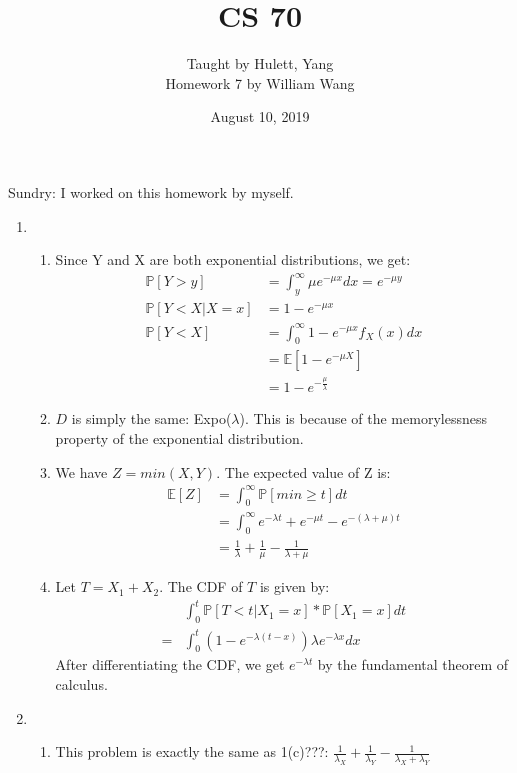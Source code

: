 \documentclass[a4paper]{article}
\title{\textbf{CS 70}}
\author{\large Taught by Hulett, Yang\\
Homework 7 by William Wang}
\date{August 10, 2019}
\newcommand{\E}{\mathbb{E}}
\renewcommand{\P}{\mathbb{P}}
\newcommand{\<}{\langle}
\renewcommand{\>}{\rangle}
\renewcommand{\^}{\wedge}
\begin{document}
\maketitle
\newpage
Sundry: I worked on this homework by myself.\\
\begin{enumerate}
   \item
        \begin{enumerate}
            \item Since Y and X are both exponential distributions, we get: 
            \begin{align*}
                \P[Y > y] &= \int_y^\infty \mu e^{-\mu x}dx = e^{-\mu y}\\
                \P[Y < X | X = x] &= 1 - e^{-\mu x} \\
                \P[Y < X] &= \int_0^\infty 1 - e^{-\mu x} f_X(x)dx\\
                &= \E[1 - e^{-\mu X}]\\
                &= 1 - e^{-\frac{\mu}{\lambda}}
            \end{align*}
            \item $D$ is simply the same: Expo($\lambda$). This is because of the memorylessness property of the exponential distribution.
            \item We have $Z = min(X, Y)$. The expected value of Z is:
            \begin{align*}
                \E[Z] &= \int_0^\infty \P[min \geq t] dt\\
                &= \int_0^\infty e^{-\lambda t} + e^{-\mu t} - e^{-(\lambda + \mu)t}\\
                &= \frac{1}{\lambda} + \frac{1}{\mu} - \frac{1}{\lambda + \mu}
            \end{align*}
            \item Let $T = X_1 + X_2$. The CDF of $T$ is given by:
            \begin{align*}
                &\int_0^t \P[T<t|X_1 = x] * \P[X_1 = x]dt\\
                = &\int_0^t (1-e^{-\lambda (t-x)})\lambda e^{-\lambda x}dx
            \end{align*}
            After differentiating the CDF, we get $e^{-\lambda t}$ by the fundamental theorem of calculus.
        \end{enumerate}
   \item
        \begin{enumerate}
            \item This problem is exactly the same as 1(c)???: $\frac{1}{\lambda_X} + \frac{1}{\lambda_Y} - \frac{1}{\lambda_X + \lambda_Y}$

\end{enumerate}
\end{enumerate}
\end{document}
